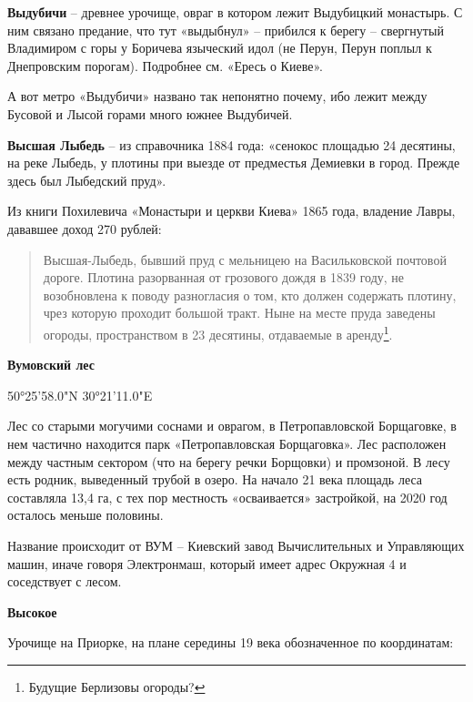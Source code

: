 \medskip

\textbf{Выдубичи} – древнее урочище, овраг в котором лежит Выдубицкий монастырь. С ним связано предание, что тут «выдыбнул» – прибился к берегу – свергнутый Владимиром с горы у Боричева языческий идол (не Перун, Перун поплыл к Днепровским порогам). Подробнее см. «Ересь о Киеве».

А вот метро «Выдубичи» названо так непонятно почему, ибо лежит между Бусовой и Лысой горами много южнее Выдубичей.\\

\medskip

\textbf{Высшая Лыбедь} – из справочника 1884 года: «сенокос площадью 24 десятины, на реке Лыбедь, у плотины при выезде от предместья Демиевки в город. Прежде здесь был Лыбедский пруд».

Из книги Похилевича «Монастыри и церкви Киева» 1865 года, владение Лавры, дававшее доход 270 рублей:

\begin{quotation}
\noindent Высшая-Лыбедь, бывший пруд с мельницею на Васильковской почтовой дороге. Плотина разорванная от грозового дождя в 1839 году, не возобновлена к поводу разногласия о том, кто должен содержать плотину, чрез которую проходит большой тракт. Ныне на месте пруда заведены огороды, пространством в 23 десятины, отдаваемые в аренду\footnote{Будущие Берлизовы огороды?}. 
\end{quotation}

\medskip

\textbf{Вумовский лес}

50°25'58.0"N 30°21'11.0"E

Лес со старыми могучими соснами и оврагом, в Петропавловской Борщаговке, в нем частично находится парк «Петропавловская Борщаговка». Лес расположен между частным сектором (что на берегу речки Борщовки) и промзоной. В лесу есть родник, выведенный трубой в озеро. На начало 21 века площадь леса составляла 13,4 га, с тех пор местность «осваивается» застройкой, на 2020 год осталось меньше половины.

Название происходит от ВУМ – Киевский завод Вычислительных и Управляющих машин, иначе говоря Электронмаш, который имеет адрес Окружная 4 и соседствует с лесом.\\

\medskip

\textbf{Высокое}

Урочище на Приорке, на плане середины 19 века обозначенное по координатам:

